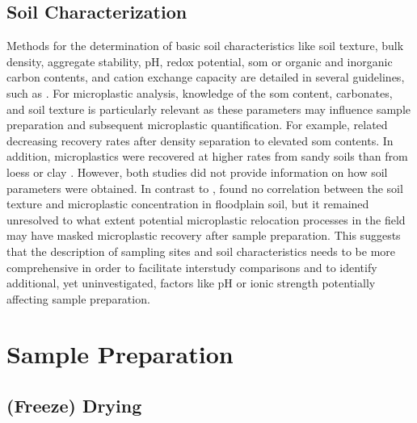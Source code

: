 \subsection{Soil Characterization}
\label{sec:analytical-techniques:soil-characterization}

Methods for the determination of basic soil characteristics like soil texture, bulk density, aggregate stability, pH, redox potential, \ac{som} or organic and inorganic carbon contents, and cation exchange capacity are detailed in several guidelines, such as \citet{ISO11277Soil2020,ISO11272Soil2017,DINEN15935Sludge2020}. For microplastic analysis, knowledge of the \ac{som} content, carbonates, and soil texture is particularly relevant as these parameters may influence sample preparation and subsequent microplastic quantification. For example, \citet{CorradiniEvidence2019} related decreasing recovery rates after density separation to elevated \ac{som} contents.
In addition, microplastics were recovered at higher rates from sandy soils than from loess or clay \citep{ZhangSimple2018}.
However, both studies did not provide information on how soil parameters were obtained. In contrast to \citet{ZhangSimple2018}, \citet{ScheurerMicroplastics2018} found no correlation between the soil texture and microplastic concentration in floodplain soil, but it remained unresolved to what extent potential microplastic relocation processes in the field may have masked microplastic recovery after sample preparation. This suggests that the description of sampling sites and soil characteristics needs to be more comprehensive in order to facilitate interstudy comparisons and to identify additional, yet uninvestigated, factors like pH or ionic strength potentially affecting sample preparation.

\section{Sample Preparation}
\label{sec:analytical-techniques:sample-prep}

\subsection{(Freeze) Drying}
\label{sec:analytical-techniques:drying}

